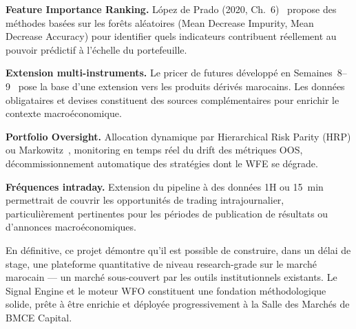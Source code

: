 \textbf{Feature Importance Ranking.}
López de Prado (2020, Ch.~6)~\cite{lopezdeprado2020} propose des méthodes basées
sur les forêts aléatoires (Mean Decrease Impurity, Mean Decrease Accuracy) pour
identifier quels indicateurs contribuent réellement au pouvoir prédictif à l'échelle
du portefeuille.

\textbf{Extension multi-instruments.}
Le pricer de futures développé en Semaines~8--9~\cite{rapport_s9} pose la base d'une
extension vers les produits dérivés marocains. Les données obligataires et devises
constituent des sources complémentaires pour enrichir le contexte macroéconomique.

\textbf{Portfolio Oversight.}
Allocation dynamique par Hierarchical Risk Parity (HRP) ou Markowitz~\cite{markowitz1952},
monitoring en temps réel du drift des métriques OOS, décommissionnement automatique
des stratégies dont le WFE se dégrade.

\textbf{Fréquences intraday.}
Extension du pipeline à des données 1H ou 15~min permettrait de couvrir les
opportunités de trading intrajournalier, particulièrement pertinentes pour les
périodes de publication de résultats ou d'annonces macroéconomiques.

\medskip

\noindent En définitive, ce projet démontre qu'il est possible de construire, dans un
délai de stage, une plateforme quantitative de niveau \og research-grade \fg{} sur le
marché marocain — un marché sous-couvert par les outils institutionnels existants.
Le Signal Engine et le moteur WFO constituent une fondation méthodologique solide,
prête à être enrichie et déployée progressivement à la Salle des Marchés de BMCE Capital.
